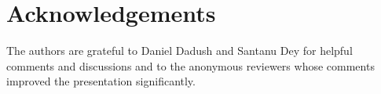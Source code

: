 \documentclass[11pt]{article}
\theoremstyle{remark}
\begin{document}
\section*{Acknowledgements}
\label{sec:acknowledgements}

The authors are grateful to Daniel Dadush and Santanu Dey for
helpful comments and discussions and to the anonymous reviewers whose
comments improved the presentation significantly. 




\end{document}
